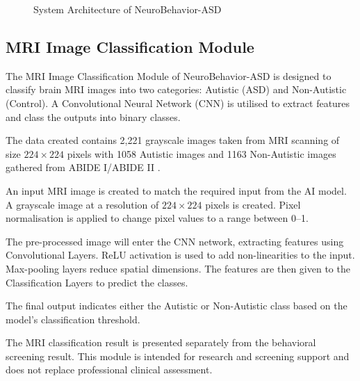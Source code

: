 \documentclass[conference]{IEEEtran}
\begin{document}
\begin{figure}[!t]
{
}
\caption{System Architecture of NeuroBehavior-ASD}
\label{fig:system_architecture}
\end{figure}

\subsection{MRI Image Classification Module}
The MRI Image Classification Module of NeuroBehavior-ASD is designed to classify brain MRI images into two categories: Autistic (ASD) and Non-Autistic (Control). A Convolutional Neural Network (CNN) is utilised to extract features and class the outputs into binary classes.

The data created contains 2,221 grayscale images taken from MRI scanning of size $224 \times 224$ pixels with 1058 Autistic images and 1163 Non-Autistic images gathered from ABIDE I/ABIDE II \cite{khan2025}.

An input MRI image is created to match the required input from the AI model. A grayscale image at a resolution of $224 \times 224$ pixels is created. Pixel normalisation is applied to change pixel values to a range between 0--1.

The pre-processed image will enter the CNN network, extracting features using Convolutional Layers. ReLU activation is used to add non-linearities to the input. Max-pooling layers reduce spatial dimensions. The features are then given to the Classification Layers to predict the classes.

The final output indicates either the Autistic or Non-Autistic class based on the model's classification threshold.

The MRI classification result is presented separately from the behavioral screening result. This module is intended for research and screening support and does not replace professional clinical assessment.
\end{document}
